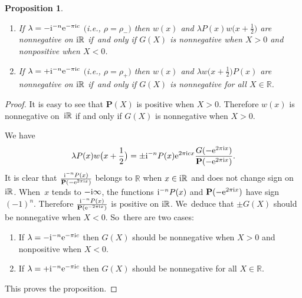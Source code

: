 \documentclass[10pt,a4paper]{amsart}
\newcommand{\RN}{\mathbb{R}} %
\newcommand{\bP}{\mathbf{P}}
\newtheorem{Proposition}[Theorem]{Proposition}
\theoremstyle{definition}
\numberwithin{equation}{section}
\begin{document}
\begin{Proposition}
\label{PropFromFunctionsToPolynomials}\qquad
\begin{enumerate}\itemsep=0pt
\item[$1.$]
If $\lambda=-{\rm i}^{-n}{\rm e}^{-\pi {\rm i}c}$ $($i.e., $\rho=\rho_-)$ then $w(x)$ and $\lambda P(x)w\big(x+\frac{1}{2}\big)$ are nonnegative on ${\rm i}\RN$ if~and only if $G(X)$ is nonnegative when $X>0$ and nonpositive when $X<0$.
\item[$2.$]
If $\lambda=+{\rm i}^{-n}{\rm e}^{-\pi {\rm i}c}$ $($i.e., $\rho=\rho_+)$ then $w(x)$ and $\lambda w\big(x+\frac{1}{2}\big)P(x)$ are nonnegative on ${\rm i}\RN$ if~and only if $G(X)$ is nonnegative for all $X\in \RN$.
\end{enumerate}

\end{Proposition}
\begin{proof}
It is easy to see that $\bP(X)$ is positive when $X>0$. Therefore $w(x)$ is nonnegative on~${\rm i}\RN$ if and only if $G(X)$ is nonnegative when $X>0$.

We have
\[
\lambda P(x)w\big(x+\frac{1}{2}\big)=\pm {\rm i}^{-n}P(x) {\rm e}^{2\pi {\rm i} cx}\frac{G(-{\rm e}^{2\pi {\rm i} x})}{\bP(-{\rm e}^{2\pi {\rm i} x})}.
\]
It is clear that $\frac{{\rm i}^{-n}P(x)}{\bP(-{\rm e}^{2\pi {\rm i} x})}$ belongs to $\RN$ when $x\in {\rm i}\RN$ and does not change sign on ${\rm i}\RN$. When~$x$ tends to $-{\rm i}\infty$, the functions ${\rm i}^{-n}P(x)$ and $\bP(-{\rm e}^{2\pi {\rm i} x})$ have sign $(-1)^n$. Therefore $\frac{{\rm i}^{-n}P(x)}{\bP({\rm e}^{-2\pi {\rm i}x})}$ is positive on ${\rm i}\RN$. We~deduce that $\pm G(X)$ should be nonnegative when $X<0$. So~there are two cases:
\begin{enumerate}\itemsep=0pt
\item
If $\lambda=-{\rm i}^{-n}{\rm e}^{-\pi {\rm i}c}$ then $G(X)$ should be nonnegative when $X>0$ and nonpositive when $X<0$.
\item
If $\lambda=+{\rm i}^{-n}{\rm e}^{-\pi {\rm i}c}$ then $G(X)$ should be nonnegative for all $X\in \RN$.
\end{enumerate}
This proves the proposition.
\end{proof}
\end{document}

